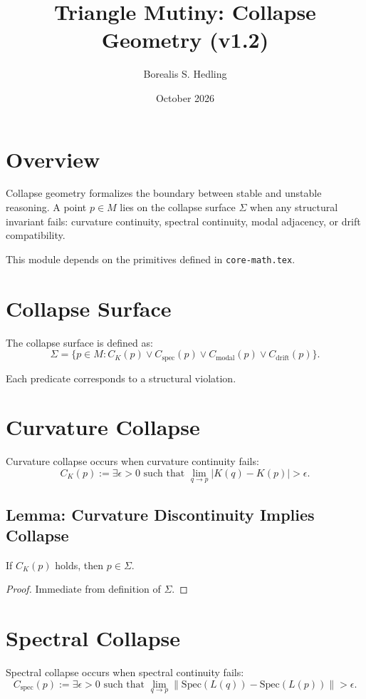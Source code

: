 \documentclass[11pt]{article}
\title{Triangle Mutiny: Collapse Geometry (v1.2)}
\author{Borealis S. Hedling}
\date{October 2026}
\begin{document}
\maketitle

\section{Overview}

Collapse geometry formalizes the boundary between stable and unstable
reasoning. A point $p \in M$ lies on the collapse surface $\Sigma$ when
any structural invariant fails: curvature continuity, spectral continuity,
modal adjacency, or drift compatibility.

This module depends on the primitives defined in \texttt{core-math.tex}.

\section{Collapse Surface}

The collapse surface is defined as:
\[
\Sigma
  = \{ p \in M :
        C_K(p) \lor
        C_{\mathrm{spec}}(p) \lor
        C_{\mathrm{modal}}(p) \lor
        C_{\mathrm{drift}}(p)
     \}.
\]

Each predicate corresponds to a structural violation.

\section{Curvature Collapse}

Curvature collapse occurs when curvature continuity fails:
\[
C_K(p)
  := \exists \epsilon > 0 \text{ such that }
     \lim_{q \to p} |K(q) - K(p)| > \epsilon.
\]

\subsection{Lemma: Curvature Discontinuity Implies Collapse}
If $C_K(p)$ holds, then $p \in \Sigma$.

\begin{proof}
Immediate from definition of $\Sigma$.
\end{proof}

\section{Spectral Collapse}

Spectral collapse occurs when spectral continuity fails:
\[
C_{\mathrm{spec}}(p)
  := \exists \epsilon > 0 \text{ such that }
     \lim_{q \to p}
       \|\mathrm{Spec}(L(q)) - \mathrm{Spec}(L(p))\|
       > \epsilon.
\]
\end{document}
